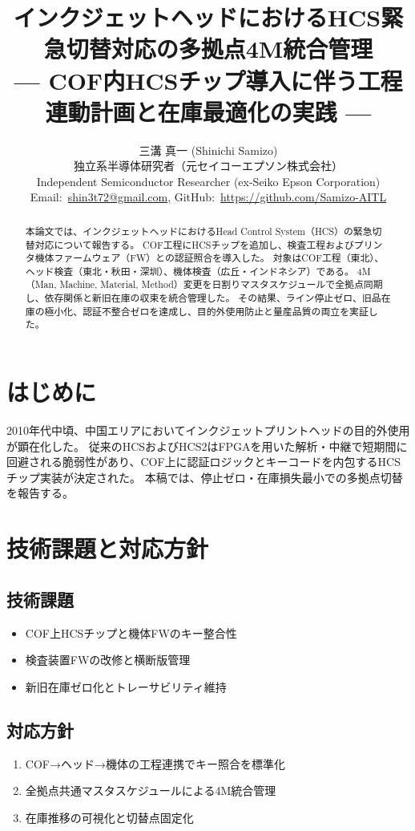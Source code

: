 \documentclass[journal,onecolumn]{IEEEtran}
\title{\Large\bfseries インクジェットヘッドにおけるHCS緊急切替対応の多拠点4M統合管理\\
— COF内HCSチップ導入に伴う工程連動計画と在庫最適化の実践 —}
\author{%
  三溝 真一 (Shinichi Samizo)\\
  独立系半導体研究者（元セイコーエプソン株式会社）\\
  Independent Semiconductor Researcher (ex-Seiko Epson Corporation)\\
  Email:~\href{mailto:shin3t72@gmail.com}{shin3t72@gmail.com},\;
  GitHub:~\url{https://github.com/Samizo-AITL}
}
\begin{document}
\maketitle

\begin{abstract}
本論文では、インクジェットヘッドにおけるHead Control System（HCS）の緊急切替対応について報告する。
COF工程にHCSチップを追加し、検査工程およびプリンタ機体ファームウェア（FW）との認証照合を導入した。
対象はCOF工程（東北）、ヘッド検査（東北・秋田・深圳）、機体検査（広丘・インドネシア）である。
4M（Man, Machine, Material, Method）変更を日割りマスタスケジュールで全拠点同期し、依存関係と新旧在庫の収束を統合管理した。
その結果、ライン停止ゼロ、旧品在庫の極小化、認証不整合ゼロを達成し、目的外使用防止と量産品質の両立を実証した。
\end{abstract}

\section{はじめに}
2010年代中頃、中国エリアにおいてインクジェットプリントヘッドの目的外使用が顕在化した。
従来のHCSおよびHCS2はFPGAを用いた解析・中継で短期間に回避される脆弱性があり、COF上に認証ロジックとキーコードを内包するHCSチップ実装が決定された。
本稿では、停止ゼロ・在庫損失最小での多拠点切替を報告する。

\section{技術課題と対応方針}
\subsection{技術課題}
\begin{itemize}
  \item COF上HCSチップと機体FWのキー整合性
  \item 検査装置FWの改修と横断版管理
  \item 新旧在庫ゼロ化とトレーサビリティ維持
\end{itemize}

\subsection{対応方針}
\begin{enumerate}
  \item COF→ヘッド→機体の工程連携でキー照合を標準化
  \item 全拠点共通マスタスケジュールによる4M統合管理
  \item 在庫推移の可視化と切替点固定化
\end{enumerate}
\end{document}

